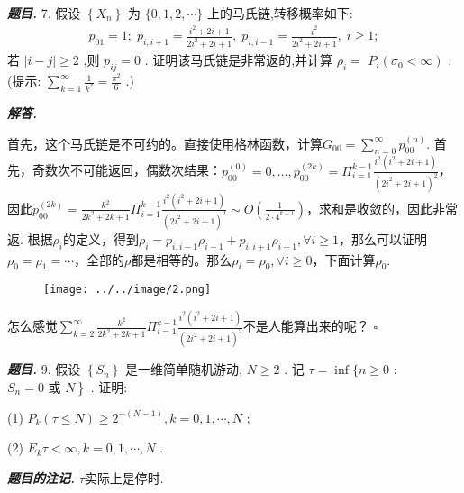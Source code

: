 \documentclass[10pt, a4paper, oneside]{ctexart}
\newenvironment{problem}{\begin{framed}\par\noindent\textbf{\textit{题目. }}}{\end{framed}\par}
\newenvironment{solution}{%
  \par\noindent\textbf{\textit{解答. }}\ignorespaces
}{%
  \hfill\ensuremath{\square}\par %
}
\newenvironment{note}{\par\noindent\textbf{\textit{题目的注记. }}\ignorespaces}{\par}
\begin{document}
    \begin{problem}
        7. 假设 \( \left\{  {X}_{n}\right\}   \) 为 \( \{ 0,1,2,\cdots \}  \) 上的马氏链,转移概率如下:
    \[\begin{matrix} {p}_{01} = 1;\;{p}_{i,i + 1} = \frac{{i}^{2} + {2i} + 1}{2{i}^{2} + {2i} + 1},\;{p}_{i,i - 1} = \frac{{i}^{2}}{2{i}^{2} + {2i} + 1},\;i \geq  1; \end{matrix}\]
    若 \( \left| {i - j}\right|  \geq  2 \) ,则 \( {p}_{ij} = 0 \) . 证明该马氏链是非常返的,并计算 \( {\rho }_{i} =  \) \( {P}_{i}\left( {{\sigma }_{0} < \infty }\right)  \) . (提示: \( \mathop{\sum }\limits_{{k = 1}}^{\infty }\frac{1}{{k}^{2}} = \frac{{\pi }^{2}}{6} \) .)
    \end{problem}
    
    \begin{solution}
        首先，这个马氏链是不可约的。直接使用格林函数，计算$G_{00}=\sum_{n=0}^{\infty}p_{00}^{(n)}$. 首先，奇数次不可能返回，偶数次结果：$p_{00}^{(0)}=0,\dots, p_{00}^{(2k)}=\Pi_{i=1}^{k-1}\frac{i^2(i^2+2i+1)}{(2i^2+2i+1)^2}$，因此$p_{00}^{(2k)}=\frac{k^2}{2k^2+2k+1}\Pi_{i=1}^{k-1}\frac{i^2(i^2+2i+1)}{(2i^2+2i+1)^2}\sim O(\frac{1}{2\cdot 4^{k-1}})$，求和是收敛的，因此非常返. 根据$\rho_i$的定义，得到$\rho_i=p_{i,i-1}\rho_{i-1}+p_{i,i+1}\rho_{i+1},\forall i\geq 1$，那么可以证明$\rho_0=\rho_1=\cdots$，全部的$\rho$都是相等的。那么$\rho_i=\rho_0,\forall i\geq 0$，下面计算$\rho_0$.
        \begin{figure}[h]
            \centering
            \texttt{[image: ../../image/2.png]}
        \end{figure}
        怎么感觉$\sum_{k=2}^{\infty}\frac{k^2}{2k^2+2k+1}\Pi_{i=1}^{k-1}\frac{i^2(i^2+2i+1)}{(2i^2+2i+1)^2}$不是人能算出来的呢？
    \end{solution}
    
    \begin{problem}
        9. 假设 \( \left\{  {S}_{n}\right\}   \) 是一维简单随机游动, \( N \geq  2 \) . 记 \( \tau  = \inf \{ n \geq  0 \) : \( \left. {{S}_{n} = 0\text{ 或 }N}\right\}   \) . 证明:
    
    (1) \( {P}_{k}\left( {\tau  \leq  N}\right)  \geq  {2}^{-\left( {N - 1}\right) },k = 0,1,\cdots ,N \) ;
    
    (2) \( {E}_{k}\tau  < \infty ,k = 0,1,\cdots ,N \) .
    \end{problem}
    \begin{note}
        $\tau$实际上是停时.
    \end{note}
    
\end{document}
